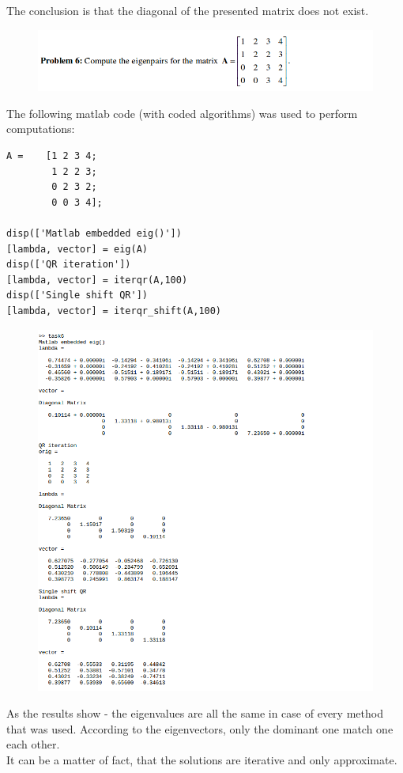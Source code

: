 \documentclass[eng,openany]{mgr}
\begin{document}
The conclusion is that the diagonal of the presented matrix does not exist.
\newpage
\begin{figure}[h]
\centering
\includegraphics[width=0.8\linewidth]{screenshot007}
\label{fig:screenshot007}
\end{figure}
The following matlab code (with coded algorithms) was used to perform computations:
\begin{lstlisting}
A =    [1 2 3 4; 
		1 2 2 3; 
		0 2 3 2; 
		0 0 3 4];

disp(['Matlab embedded eig()'])
[lambda, vector] = eig(A)
disp(['QR iteration'])
[lambda, vector] = iterqr(A,100)
disp(['Single shift QR'])
[lambda, vector] = iterqr_shift(A,100)
\end{lstlisting}
\begin{figure}[h]
\centering
\includegraphics[width=0.7\linewidth]{screenshot008}
\label{fig:screenshot008}
\end{figure}
As the results show - the eigenvalues are all the same in case of every method that was used. According to the eigenvectors, only the dominant one match one each other.\\
It can be a matter of fact, that the solutions are iterative and only approximate.
\end{document}
